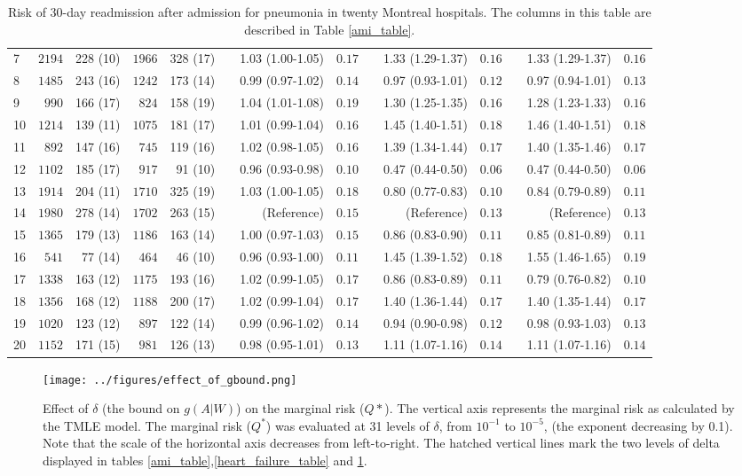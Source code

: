 \documentclass[]{article}\usepackage[]{graphicx}\usepackage[]{color}
\begin{document}
\begin{landscape}
\begin{table}[!tbp]
\begin{center}
\begin{tabular}{lrrrrcrrcrrcrr}
7&$2194$&228 (10)&$1966$&328 (17)&&1.03 (1.00-1.05)&$0.17$&&1.33 (1.29-1.37)&$0.16$&&1.33 (1.29-1.37)&$0.16$\tabularnewline
8&$1485$&243 (16)&$1242$&173 (14)&&0.99 (0.97-1.02)&$0.14$&&0.97 (0.93-1.01)&$0.12$&&0.97 (0.94-1.01)&$0.13$\tabularnewline
9&$ 990$&166 (17)&$ 824$&158 (19)&&1.04 (1.01-1.08)&$0.19$&&1.30 (1.25-1.35)&$0.16$&&1.28 (1.23-1.33)&$0.16$\tabularnewline
10&$1214$&139 (11)&$1075$&181 (17)&&1.01 (0.99-1.04)&$0.16$&&1.45 (1.40-1.51)&$0.18$&&1.46 (1.40-1.51)&$0.18$\tabularnewline
11&$ 892$&147 (16)&$ 745$&119 (16)&&1.02 (0.98-1.05)&$0.16$&&1.39 (1.34-1.44)&$0.17$&&1.40 (1.35-1.46)&$0.17$\tabularnewline
12&$1102$&185 (17)&$ 917$&91 (10)&&0.96 (0.93-0.98)&$0.10$&&0.47 (0.44-0.50)&$0.06$&&0.47 (0.44-0.50)&$0.06$\tabularnewline
13&$1914$&204 (11)&$1710$&325 (19)&&1.03 (1.00-1.05)&$0.18$&&0.80 (0.77-0.83)&$0.10$&&0.84 (0.79-0.89)&$0.11$\tabularnewline
14&$1980$&278 (14)&$1702$&263 (15)&&(Reference)&$0.15$&&(Reference)&$0.13$&&(Reference)&$0.13$\tabularnewline
15&$1365$&179 (13)&$1186$&163 (14)&&1.00 (0.97-1.03)&$0.15$&&0.86 (0.83-0.90)&$0.11$&&0.85 (0.81-0.89)&$0.11$\tabularnewline
16&$ 541$&77 (14)&$ 464$&46 (10)&&0.96 (0.93-1.00)&$0.11$&&1.45 (1.39-1.52)&$0.18$&&1.55 (1.46-1.65)&$0.19$\tabularnewline
17&$1338$&163 (12)&$1175$&193 (16)&&1.02 (0.99-1.05)&$0.17$&&0.86 (0.83-0.89)&$0.11$&&0.79 (0.76-0.82)&$0.10$\tabularnewline
18&$1356$&168 (12)&$1188$&200 (17)&&1.02 (0.99-1.04)&$0.17$&&1.40 (1.36-1.44)&$0.17$&&1.40 (1.35-1.44)&$0.17$\tabularnewline
19&$1020$&123 (12)&$ 897$&122 (14)&&0.99 (0.96-1.02)&$0.14$&&0.94 (0.90-0.98)&$0.12$&&0.98 (0.93-1.03)&$0.13$\tabularnewline
20&$1152$&171 (15)&$ 981$&126 (13)&&0.98 (0.95-1.01)&$0.13$&&1.11 (1.07-1.16)&$0.14$&&1.11 (1.07-1.16)&$0.14$\tabularnewline
\hline
\end{tabular}

\caption{Risk of 30-day readmission after admission for  pneumonia  in twenty Montreal hospitals.  The columns in this table are described in Table \ref{ami_table}.\label{pneumonia_table}}\end{center}

\end{table}

\end{landscape}

\begin{figure}[H]
    \centerline{
      \texttt{[image: ../figures/effect\_of\_gbound.png]}
    }
    \caption[Effect of $\delta$ (the bound on $g(A|W)$) on the marginal risk.]
      {Effect of $\delta$ (the bound on $g(A|W)$) on the marginal risk ($Q*$). The vertical axis represents the marginal risk as calculated by the TMLE model. The marginal risk ($Q^*$) was evaluated at 31 levels of $\delta$, from $10^{-1}$ to $10^{-5}$, (the exponent decreasing by 0.1). Note that the scale of the horizontal axis decreases from left-to-right. The hatched vertical lines mark the two levels of delta displayed in tables \ref{ami_table},\ref{heart_failure_table} and \ref{pneumonia_table}.}
    \label{fig:effect_of_gbound}
\end{figure}
\end{document}
